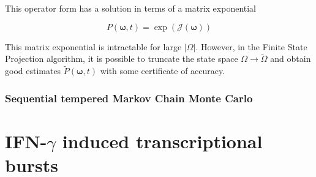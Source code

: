 \documentclass{ucetd}
\begin{document}
This operator form has a solution in terms of a matrix exponential

\begin{equation*}
P(\bm{\omega}, t) = \exp(\mathcal{J}(\bm{\omega}))
\end{equation*}

This matrix exponential is intractable for large $|\Omega|$. However, in the Finite State Projection algorithm, it is possible to truncate the state space $\Omega \rightarrow \tilde{\Omega}$ and obtain good estimates $\tilde{P}(\bm{\omega}, t)$ with some certificate of accuracy.

\subsection{Sequential tempered Markov Chain Monte Carlo}


\chapter{IFN-$\gamma$ induced transcriptional bursts}
\end{document}
